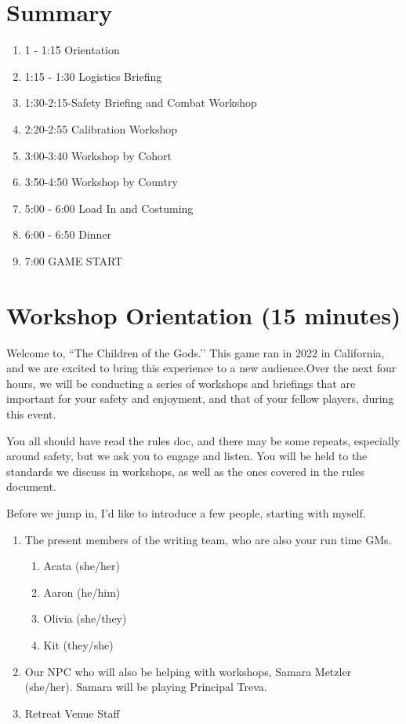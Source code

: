 \documentclass[green]{GL2020}
\begin{document}
\name{\gPreGameSafety{}}

\section*{Summary}
\begin{enumerate}
	\item 1 - 1:15 Orientation
	\item 1:15 - 1:30 Logistics Briefing
	\item 1:30-2:15-Safety Briefing and Combat Workshop
	\item 2:20-2:55 Calibration Workshop
	\item 3:00-3:40 Workshop by Cohort
	\item 3:50-4:50 Workshop by Country
	\item 5:00 - 6:00 Load In and Costuming
	\item 6:00 - 6:50 Dinner
	\item 7:00 GAME START
\end{enumerate}

\section*{Workshop Orientation (15 minutes)}
Welcome to, ``The Children of the Gods.’’ This game ran in 2022 in California, and we are excited to bring this experience to a new audience.Over the next four hours, we will be conducting a series of workshops and briefings that are important for your safety and enjoyment, and that of your fellow players, during this event. 

You all should have read the rules doc, and there may be some repeats, especially around safety, but we ask you to engage and listen. You will be held to the standards we discuss in workshops, as well as the ones covered in the rules document.

Before we jump in, I’d like to introduce a few people, starting with myself.
\begin{enumerate}
	\item The present members of the writing team, who are also your run time GMs. 	
	\begin{enumerate}
		\item Acata (she/her)
		\item Aaron (he/him)
		\item Olivia (she/they)
		\item Kit (they/she)
	\end{enumerate}
	\item Our NPC who will also be helping with workshops, Samara Metzler (she/her).  Samara will be playing Principal Treva.  
	\item Retreat Venue Staff
\end{enumerate}
\end{document}
